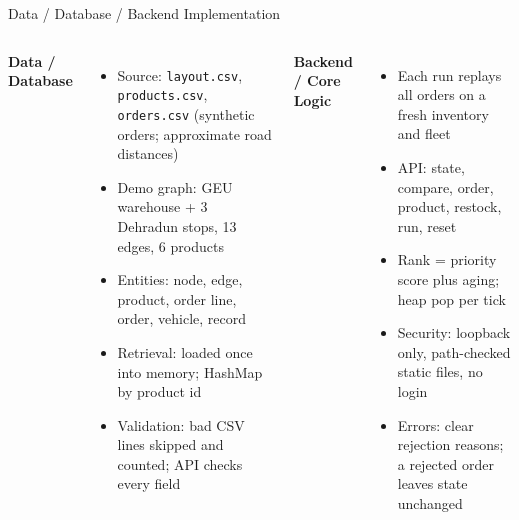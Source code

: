 \documentclass[aspectratio=169,11pt]{beamer}
\begin{document}
\begin{frame}{Data / Database / Backend Implementation}
\footnotesize
\begin{columns}[T,totalwidth=\textwidth]
\textbf{\color{GEUBlue}Data / Database}
\begin{itemize}\itemsep3pt
    \item Source: \texttt{layout.csv}, \texttt{products.csv}, \texttt{orders.csv} (synthetic orders; approximate road distances)
    \item Demo graph: GEU warehouse + 3 Dehradun stops, 13 edges, 6 products
    \item Entities: node, edge, product, order line, order, vehicle, record
    \item Retrieval: loaded once into memory; HashMap by product id
    \item Validation: bad CSV lines skipped and counted; API checks every field
\end{itemize}
\textbf{\color{GEUBlue}Backend / Core Logic}
\begin{itemize}\itemsep3pt
    \item Each run replays all orders on a fresh inventory and fleet
    \item API: state, compare, order, product, restock, run, reset
    \item Rank = priority score plus aging; heap pop per tick
    \item Security: loopback only, path-checked static files, no login
    \item Errors: clear rejection reasons; a rejected order leaves state unchanged
\end{itemize}
\end{columns}
\vfill
\end{frame}
\end{document}

